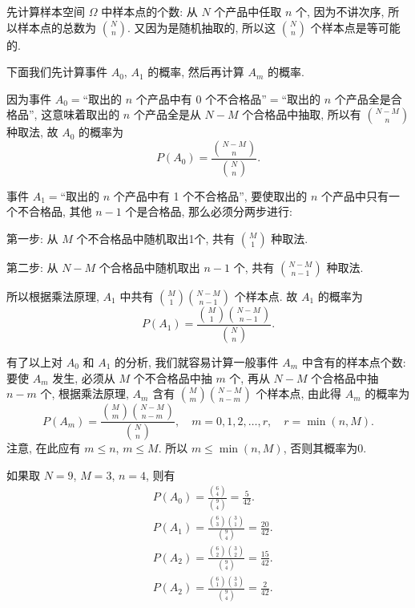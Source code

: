 \begin{solution}
  先计算样本空间 $\Omega$ 中样本点的个数:
  从 $N$ 个产品中任取 $n$ 个,
  因为不讲次序,
  所以样本点的总数为 $\binom{N}{n}$.
  又因为是随机抽取的,
  所以这 $\binom{N}{n}$ 个样本点是等可能的.

  下面我们先计算事件 $A _0$, $A _1$ 的概率,
  然后再计算 $A _m$ 的概率.

  因为事件 $A _0 =$“取出的 $n$ 个产品中有 0 个不合格品”$=$“取出的 $n$ 个产品全是合格品”,
  这意味着取出的 $n$ 个产品全是从 $N - M$ 个合格品中抽取,
  所以有 $\binom{N - M}{n}$ 种取法,
  故 $A _0$ 的概率为
  \[
    P (A _0) = \frac{\binom{N - M}{n}}{\binom{N}{n}}.
  \]

  事件 $A _1 =$“取出的 $n$ 个产品中有 1 个不合格品”,
  要使取出的 $n$ 个产品中只有一个不合格品,
  其他 $n - 1$ 个是合格品,
  那么必须分两步进行:

  第一步:
  从 $M$ 个不合格品中随机取出1个,
  共有 $\binom{M}{1}$ 种取法.

  第二步:
  从 $N - M$ 个合格品中随机取出 $n - 1$ 个,
  共有 $\binom{N - M}{n - 1}$ 种取法.

  所以根据乘法原理,
  $A _1$ 中共有 $\binom{M}{1} \binom{N - M}{n - 1}$ 个样本点.
  故 $A _1$ 的概率为
  \[
    P (A _1) = \frac{\binom{M}{1} \binom{N - M}{n - 1}}{\binom{N}{n}}.
  \]

  有了以上对 $A _0$ 和 $A _1$ 的分析,
  我们就容易计算一般事件 $A _m$ 中含有的样本点个数:
  要使 $A _m$ 发生,
  必须从 $M$ 个不合格品中抽 $m$ 个,
  再从 $N - M$ 个合格品中抽 $n - m$ 个,
  根据乘法原理,
  $A _m$ 含有 $\binom{M}{m} \binom{N - M}{n - m}$ 个样本点,
  由此得 $A _m$ 的概率为
  \begin{equation}
    P (A _m) = \frac{\binom{M}{m} \binom{N - M}{n - m}}{\binom{N}{n}},
    \quad m = 0,1,2,\dotsc,r, \quad r = \min (n, M).\label{eq1.2.6}
  \end{equation}
  注意,
  在此应有 $m \le n$, $m \le M$.
  所以 $m \le \min(n,M)$,
  否则其概率为0.

  如果取 $N=9$,
  $M=3$,
  $n=4$,
  则有
  \begin{align*}
    & P (A _0) = \frac{\binom{6}{4}}{\binom{9}{4}} = \frac{5}{42}.\\
    & P (A _1) = \frac{\binom{6}{3}\binom{3}{1}}{\binom{9}{4}} = \frac{20}{42}.\\
    & P (A _2) = \frac{\binom{6}{2}\binom{3}{2}}{\binom{9}{4}} = \frac{15}{42}.\\
    & P (A _2) = \frac{\binom{6}{1}\binom{3}{3}}{\binom{9}{4}} = \frac{2}{42}.
  \end{align*}


\end{solution}

